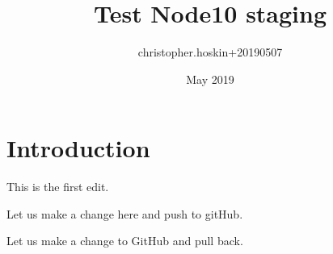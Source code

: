 \documentclass{article}
\title{Test Node10 staging}
\author{christopher.hoskin+20190507 }
\date{May 2019}
\begin{document}
\maketitle

\section{Introduction}

This is the first edit.

\cite{}

Let us make a change here and push to gitHub.

Let us make a change to GitHub and pull back.
\end{document}

